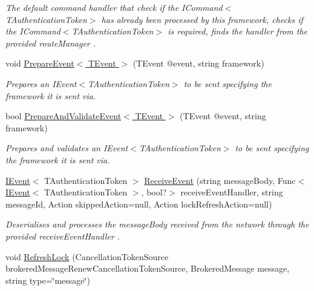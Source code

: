 \begin{DoxyCompactItemize}
\begin{DoxyCompactList}\small\item\em The default command handler that check if the I\+Command$<$\+T\+Authentication\+Token$>$ has already been processed by this framework, checks if the I\+Command$<$\+T\+Authentication\+Token$>$ is required, finds the handler from the provided {\itshape route\+Manager} . \end{DoxyCompactList}\item 
void \hyperlink{interfaceCqrs_1_1Azure_1_1ServiceBus_1_1IAzureBusHelper_ab7d1fa5162adc0f01edcf9039bb43c2c_ab7d1fa5162adc0f01edcf9039bb43c2c}{Prepare\+Event$<$ T\+Event $>$} (T\+Event @event, string framework)
\begin{DoxyCompactList}\small\item\em Prepares an I\+Event$<$\+T\+Authentication\+Token$>$ to be sent specifying the framework it is sent via. \end{DoxyCompactList}\item 
bool \hyperlink{interfaceCqrs_1_1Azure_1_1ServiceBus_1_1IAzureBusHelper_ac5cbeb6e8bbdb1a98501f0b746c12abd_ac5cbeb6e8bbdb1a98501f0b746c12abd}{Prepare\+And\+Validate\+Event$<$ T\+Event $>$} (T\+Event @event, string framework)
\begin{DoxyCompactList}\small\item\em Prepares and validates an I\+Event$<$\+T\+Authentication\+Token$>$ to be sent specifying the framework it is sent via. \end{DoxyCompactList}\item 
\hyperlink{interfaceCqrs_1_1Events_1_1IEvent}{I\+Event}$<$ T\+Authentication\+Token $>$ \hyperlink{interfaceCqrs_1_1Azure_1_1ServiceBus_1_1IAzureBusHelper_a76964549b420e762fddc08ba371c41b2_a76964549b420e762fddc08ba371c41b2}{Receive\+Event} (string message\+Body, Func$<$ \hyperlink{interfaceCqrs_1_1Events_1_1IEvent}{I\+Event}$<$ T\+Authentication\+Token $>$, bool?$>$ receive\+Event\+Handler, string message\+Id, Action skipped\+Action=null, Action lock\+Refresh\+Action=null)
\begin{DoxyCompactList}\small\item\em Deserialises and processes the {\itshape message\+Body}  received from the network through the provided {\itshape receive\+Event\+Handler} . \end{DoxyCompactList}\item 
void \hyperlink{interfaceCqrs_1_1Azure_1_1ServiceBus_1_1IAzureBusHelper_a51988703dad9dc41c834e620e4e6e31a_a51988703dad9dc41c834e620e4e6e31a}{Refresh\+Lock} (Cancellation\+Token\+Source brokered\+Message\+Renew\+Cancellation\+Token\+Source, Brokered\+Message message, string type=\char`\"{}message\char`\"{})

\end{DoxyCompactItemize}
